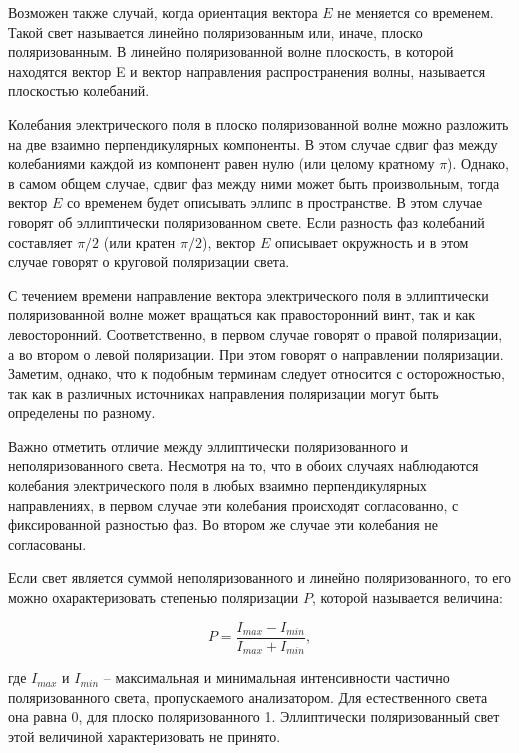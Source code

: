 \documentclass[a4paper,14pt]{extarticle}
\begin{document}
			Возможен также случай, когда ориентация вектора $E$ не меняется со временем. Такой свет называется линейно поляризованным или, иначе, плоско поляризованным. В линейно поляризованной волне плоскость, в которой находятся вектор E и вектор направления распространения волны, называется плоскостью колебаний. 
			
			Колебания электрического поля в плоско поляризованной волне можно разложить на две взаимно перпендикулярных компоненты. В этом случае сдвиг фаз между колебаниями каждой из компонент равен нулю (или целому кратному $\pi$). Однако, в самом общем случае, сдвиг фаз между ними может быть произвольным, тогда вектор $E$ со временем будет описывать эллипс в пространстве. В этом случае говорят об эллиптически поляризованном свете. Если разность фаз колебаний составляет $\pi/2$ (или кратен $\pi/2$), вектор $E$ описывает окружность и в этом случае говорят о круговой поляризации света. 
			
			С течением времени направление вектора электрического поля в эллиптически поляризованной волне может вращаться как правосторонний винт, так и как левосторонний. Соответственно, в первом случае говорят о правой поляризации, а во втором о левой поляризации. При этом говорят о направлении поляризации. Заметим, однако, что к подобным терминам следует относится с осторожностью, так как в различных источниках направления поляризации могут быть определены по разному. 
			
			Важно отметить отличие между эллиптически поляризованного и неполяризованного света. Несмотря на то, что в обоих случаях наблюдаются колебания электрического поля в	любых взаимно перпендикулярных направлениях, в первом случае эти колебания происходят согласованно, с фиксированной разностью фаз. Во втором же случае эти колебания не согласованы. 
			
			Если свет является суммой неполяризованного и линейно поляризованного, то его можно охарактеризовать степенью поляризации $P$, которой называется величина:
			
			\begin{equation}
				P = \frac{I_{max} - I_{min}}{I_{max} + I_{min}},
			\end{equation}
			
			где $I_{max}$ и $I_{min}$ – максимальная и минимальная интенсивности частично поляризованного света, пропускаемого анализатором. Для естественного света она равна 0, для плоско	поляризованного 1. Эллиптически поляризованный свет этой величиной характеризовать не принято.
			
\end{document}
